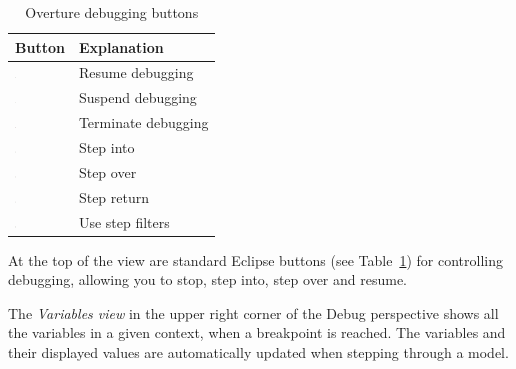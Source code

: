 \begin{table}
\begin{center}
\caption{Overture debugging buttons\label{tab:debugButtons}}
\begin{tabular}{|l|l|}\hline \hline
\textbf{Button} & \textbf{Explanation} \\ \hline
\includegraphics[width=0.03\textwidth]{figures/resume} & Resume debugging \\
\includegraphics[width=0.03\textwidth]{figures/suspend} & Suspend debugging\\
\includegraphics[width=0.03\textwidth]{figures/terminate} & Terminate debugging\\
\includegraphics[width=0.03\textwidth]{figures/stepinto} & Step into\\
\includegraphics[width=0.03\textwidth]{figures/stepover} & Step over \\
\includegraphics[width=0.03\textwidth]{figures/stepreturn} & Step return\\
\includegraphics[width=0.03\textwidth]{figures/stepbystep} & Use step filters\\
\hline \hline
\end{tabular}
\end{center}
\end{table}

At the top of the view are standard Eclipse buttons (see
Table~\ref{tab:debugButtons}) for controlling debugging, allowing you
to stop, step into, step over and resume.

The \emph{Variables view} in the upper right corner of the Debug
perspective shows all the variables in a given context, when a
breakpoint is reached. The variables and their displayed values are
automatically updated when stepping through a model.

